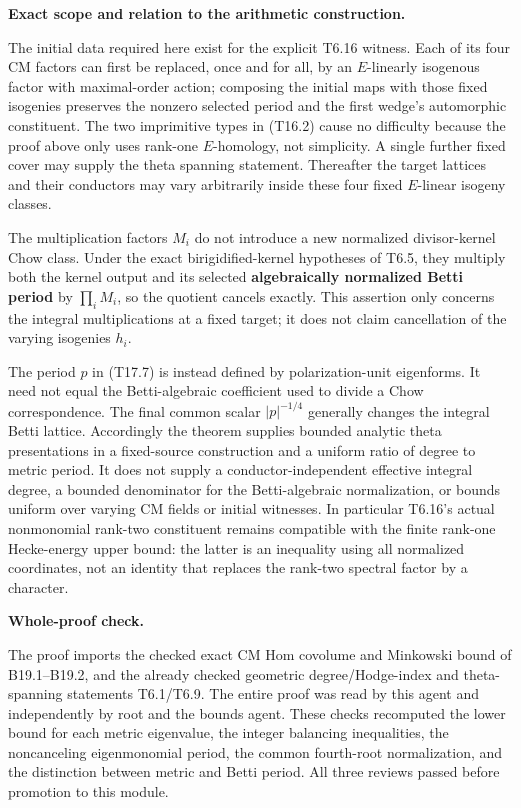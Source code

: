 \textbf{Exact scope and relation to the arithmetic construction.}

The initial data required here exist for the explicit T6.16 witness. Each of its four CM factors can first be replaced, once and for all, by an \(E\)-linearly isogenous factor with maximal-order action; composing the initial maps with those fixed isogenies preserves the nonzero selected period and the first wedge's automorphic constituent. The two imprimitive types in (T16.2) cause no difficulty because the proof above only uses rank-one \(E\)-homology, not simplicity. A single further fixed cover may supply the theta spanning statement. Thereafter the target lattices and their conductors may vary arbitrarily inside these four fixed \(E\)-linear isogeny classes.

The multiplication factors \(M_i\) do not introduce a new normalized divisor-kernel Chow class. Under the exact birigidified-kernel hypotheses of T6.5, they multiply both the kernel output and its selected \textbf{algebraically normalized Betti period} by \(\prod_iM_i\), so the quotient cancels exactly. This assertion only concerns the integral multiplications at a fixed target; it does not claim cancellation of the varying isogenies \(h_i\).

The period \(p\) in (T17.7) is instead defined by polarization-unit eigenforms. It need not equal the Betti-algebraic coefficient used to divide a Chow correspondence. The final common scalar \(|p|^{-1/4}\) generally changes the integral Betti lattice. Accordingly the theorem supplies bounded analytic theta presentations in a fixed-source construction and a uniform ratio of degree to metric period. It does not supply a conductor-independent effective integral degree, a bounded denominator for the Betti-algebraic normalization, or bounds uniform over varying CM fields or initial witnesses. In particular T6.16's actual nonmonomial rank-two constituent remains compatible with the finite rank-one Hecke-energy upper bound: the latter is an inequality using all normalized coordinates, not an identity that replaces the rank-two spectral factor by a character.

\textbf{Whole-proof check.}

The proof imports the checked exact CM Hom covolume and Minkowski bound of B19.1--B19.2, and the already checked geometric degree/Hodge-index and theta-spanning statements T6.1/T6.9. The entire proof was read by this agent and independently by root and the bounds agent. These checks recomputed the lower bound for each metric eigenvalue, the integer balancing inequalities, the noncanceling eigenmonomial period, the common fourth-root normalization, and the distinction between metric and Betti period. All three reviews passed before promotion to this module.

